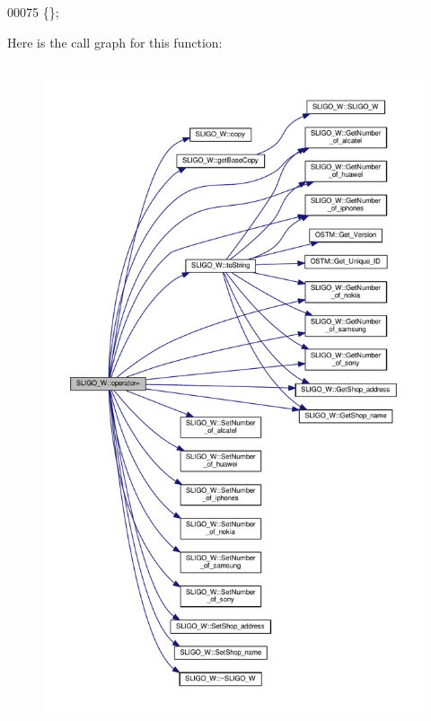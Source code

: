 \begin{DoxyCode}
00075 \{\};
\end{DoxyCode}


Here is the call graph for this function\+:\nopagebreak
\begin{figure}[H]
\begin{center}
\leavevmode
\includegraphics[height=550pt]{class_s_l_i_g_o___w_a64051fdd5b3ebc47b0a74b42eb092c1b_a64051fdd5b3ebc47b0a74b42eb092c1b_cgraph}
\end{center}
\end{figure}



